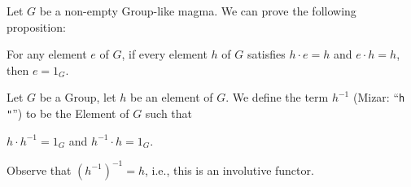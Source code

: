 \documentclass{article}
\begin{document}
  
Let $G$ be a non-empty Group-like magma. We can prove the following proposition:
\begin{thm}
\item\label{group1:4} For any element $e$ of $G$, if every element $h$
  of $G$ satisfies $h\cdot e=h$ and $e\cdot h=h$, then $e=1_{G}$.
\end{thm}

\begin{definition}
Let $G$ be a Group, let $h$ be an element of $G$.
We define the term $h^{-1}$ (Mizar: ``\verb#h "#'') to be the Element of
$G$ such that
\begin{defn}
\item $h\cdot h^{-1}=1_{G}$ and $h^{-1}\cdot h = 1_{G}$.
\end{defn}
Observe that $(h^{-1})^{-1}=h$, i.e., this is an involutive functor.
\end{definition}
\end{document}
